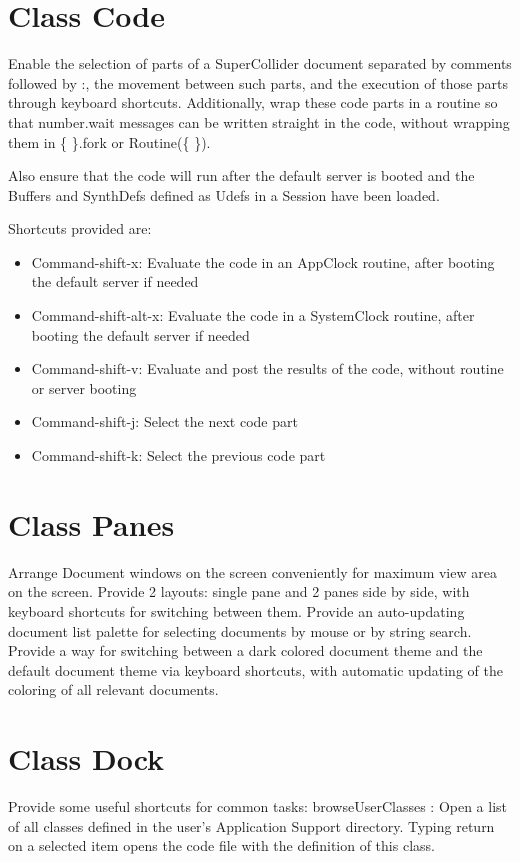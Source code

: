 \documentclass[11pt]{article}
\begin{document}
\section{Class Code}
\label{sec-5}


Enable the selection of parts of a SuperCollider document separated by comments followed by :, the movement between such parts, and the execution of those parts through keyboard shortcuts. Additionally, wrap these code parts in a routine so that number.wait messages can be written straight in the code, without wrapping them in \{ \}.fork or Routine(\{ \}). 

Also ensure that the code will run after the default server is booted and the Buffers and SynthDefs defined as Udefs in a Session have been loaded. 

Shortcuts provided are: 

\begin{itemize}
\item Command-shift-x: Evaluate the code in an AppClock routine, after booting the default server if needed
\item Command-shift-alt-x: Evaluate the code in a SystemClock routine, after booting the default server if needed
\item Command-shift-v: Evaluate and post the results of the code, without routine or server booting
\item Command-shift-j: Select the next code part
\item Command-shift-k: Select the previous code part
\end{itemize}
\section{Class Panes}
\label{sec-6}


Arrange Document windows on the screen conveniently for maximum view area on the screen. Provide 2 layouts: single pane and 2 panes side by side, with keyboard shortcuts for switching between them. Provide an auto-updating document list palette for selecting documents by mouse or by string search. Provide a way for switching between a dark colored document theme and the default document theme via keyboard shortcuts, with automatic updating of the coloring of all relevant documents. 
\section{Class Dock}
\label{sec-7}


Provide some useful shortcuts for common tasks: 
   browseUserClasses :    Open a list of all classes defined in the user's Application Support 
      directory. Typing return on a selected item opens the code file with the definition of this class. 
\end{document}
